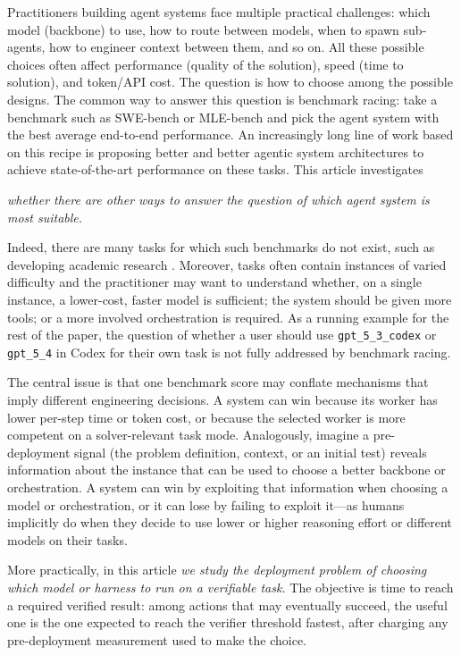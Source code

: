 \documentclass{article}
\begin{document}
Practitioners building agent systems face multiple practical challenges:
which model (backbone) to use, how to route between models, when to spawn sub-agents, how to engineer context between them, and so on.
All these possible choices often affect performance (quality of the solution), speed (time to solution), and token/API cost.
The question is how to choose among the possible designs.
The common way to answer this question is benchmark racing:
take a benchmark such as SWE-bench \citep{jimenez2024swebench} or MLE-bench \citep{chan2024mlebench} and pick the agent system with the best average end-to-end performance.
An increasingly long line of work based on this recipe is proposing better and better agentic system architectures to achieve state-of-the-art performance on these tasks.
This article investigates
\begin{center}
    \textit{
    whether there are other ways to answer the question of which agent system is most suitable.}
\end{center}
Indeed, there are many tasks for which such benchmarks do not exist, such as developing academic research \citep{PoggioAIMSc_2026}. Moreover, tasks often contain instances of varied difficulty and the practitioner may want to understand whether, on a single instance, a lower-cost, faster model is sufficient; the system should be given more tools; or a more involved orchestration is required.
As a running example for the rest of the paper, the question of whether a user should use \texttt{gpt\_5\_3\_codex} or \texttt{gpt\_5\_4} in Codex for their own task is not fully addressed by benchmark racing.

The central issue is that one benchmark score may conflate mechanisms that imply different engineering decisions.
A system can win because its worker has lower per-step time or token cost, or because the selected worker is more competent on a solver-relevant task mode.
Analogously, imagine a pre-deployment signal (the problem definition, context, or an initial test) reveals information about the instance that can be used to choose a better backbone or orchestration.
A system can win by exploiting that information when choosing a model or orchestration, or it can lose by failing to exploit it---as humans implicitly do when they decide to use lower or higher reasoning effort or different models on their tasks.

More practically, in this article
\textit{we study the deployment problem of choosing which model or harness to run on a verifiable task.}
The objective is time to reach a required verified result: among actions that may eventually succeed, the useful one is the one expected to reach the verifier threshold fastest, after charging any pre-deployment measurement used to make the choice.
\end{document}
